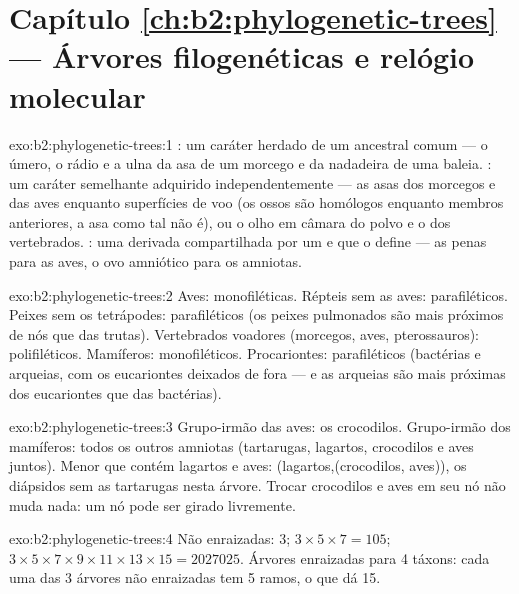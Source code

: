 \section*{Capítulo \ref{ch:b2:phylogenetic-trees} --- Árvores filogenéticas e relógio molecular}

\begin{solution}{exo:b2:phylogenetic-trees:1}
: um caráter herdado de um ancestral comum --- o úmero, o rádio
e a ulna da asa de um morcego e da nadadeira de uma baleia. : um
caráter semelhante adquirido independentemente --- as asas dos morcegos e
das aves enquanto superfícies de voo (os ossos são homólogos enquanto
membros anteriores, a asa como tal não é), ou o olho em câmara do polvo e
o dos vertebrados. : uma  derivada compartilhada por
um  e que o define --- as penas para as aves, o ovo amniótico para
os amniotas.
\end{solution}

\begin{solution}{exo:b2:phylogenetic-trees:2}
Aves: monofiléticas. Répteis sem as aves: parafiléticos. Peixes sem os
tetrápodes: parafiléticos (os peixes pulmonados são mais próximos de nós
que das trutas). Vertebrados voadores (morcegos, aves, pterossauros):
polifiléticos. Mamíferos: monofiléticos. Procariontes: parafiléticos
(bactérias e arqueias, com os eucariontes deixados de fora --- e as
arqueias são mais próximas dos eucariontes que das bactérias).
\end{solution}

\begin{solution}{exo:b2:phylogenetic-trees:3}
Grupo-irmão das aves: os crocodilos. Grupo-irmão dos mamíferos: todos os
outros amniotas (tartarugas, lagartos, crocodilos e aves juntos). Menor
 que contém lagartos e aves: (lagartos,(crocodilos, aves)), os
diápsidos sem as tartarugas nesta árvore. Trocar crocodilos e aves em seu
nó não muda nada: um nó pode ser girado livremente.
\end{solution}

\begin{solution}{exo:b2:phylogenetic-trees:4}
Não enraizadas: $3$; $3\times 5\times 7 = 105$; $3\times 5\times
7\times 9\times 11\times 13\times 15 = \num{2027025}$. Árvores
enraizadas para 4 táxons: cada uma das 3 árvores não enraizadas tem 5
ramos, o que dá 15.
\end{solution}

